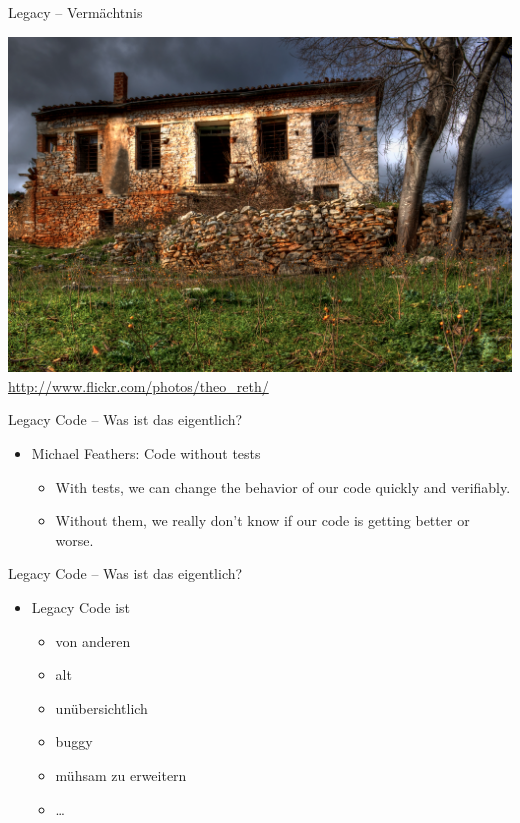 \begin{frame}[fragile]{Legacy -- Vermächtnis}
\begin{minipage}{.8 \paperwidth}
\includegraphics[width=\textwidth]{VerfallenesHaus.png} \newline
{\tiny \hspace*{\fill} \url{http://www.flickr.com/photos/theo_reth/}}
\end{minipage}
\end{frame}

\begin{frame}[fragile]{Legacy Code -- Was ist das eigentlich?}
\begin{itemize}
\item Michael Feathers: \glqq Code without tests\grqq
\begin{itemize}
\item \glqq With tests, we can change the behavior of our code quickly and verifiably.\grqq
\item \glqq Without them, we really don't know if our code is getting better or worse.\grqq
\end{itemize}

\end{itemize}

\end{frame}


\begin{frame}[fragile]{Legacy Code -- Was ist das eigentlich?}
\begin{itemize}
\item Legacy Code ist
\begin{itemize}
\item von anderen
\item alt
\item unübersichtlich
\item buggy
\item mühsam zu erweitern
\item …
\end{itemize}
\end{itemize}

\end{frame}


